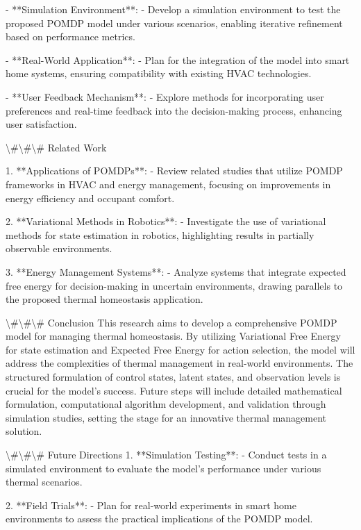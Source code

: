 \documentclass[11pt,a4paper]{article}
\begin{document}
- **Simulation Environment**: 
   - Develop a simulation environment to test the proposed POMDP model under various scenarios, enabling iterative refinement based on performance metrics.

- **Real-World Application**: 
   - Plan for the integration of the model into smart home systems, ensuring compatibility with existing HVAC technologies.

- **User Feedback Mechanism**: 
   - Explore methods for incorporating user preferences and real-time feedback into the decision-making process, enhancing user satisfaction.

\textbackslash{}#\textbackslash{}#\textbackslash{}# Related Work

1. **Applications of POMDPs**: 
   - Review related studies that utilize POMDP frameworks in HVAC and energy management, focusing on improvements in energy efficiency and occupant comfort.

2. **Variational Methods in Robotics**: 
   - Investigate the use of variational methods for state estimation in robotics, highlighting results in partially observable environments.

3. **Energy Management Systems**: 
   - Analyze systems that integrate expected free energy for decision-making in uncertain environments, drawing parallels to the proposed thermal homeostasis application.

\textbackslash{}#\textbackslash{}#\textbackslash{}# Conclusion
This research aims to develop a comprehensive POMDP model for managing thermal homeostasis. By utilizing Variational Free Energy for state estimation and Expected Free Energy for action selection, the model will address the complexities of thermal management in real-world environments. The structured formulation of control states, latent states, and observation levels is crucial for the model's success. Future steps will include detailed mathematical formulation, computational algorithm development, and validation through simulation studies, setting the stage for an innovative thermal management solution.

\textbackslash{}#\textbackslash{}#\textbackslash{}# Future Directions
1. **Simulation Testing**: 
   - Conduct tests in a simulated environment to evaluate the model's performance under various thermal scenarios.

2. **Field Trials**: 
   - Plan for real-world experiments in smart home environments to assess the practical implications of the POMDP model.
\end{document}
